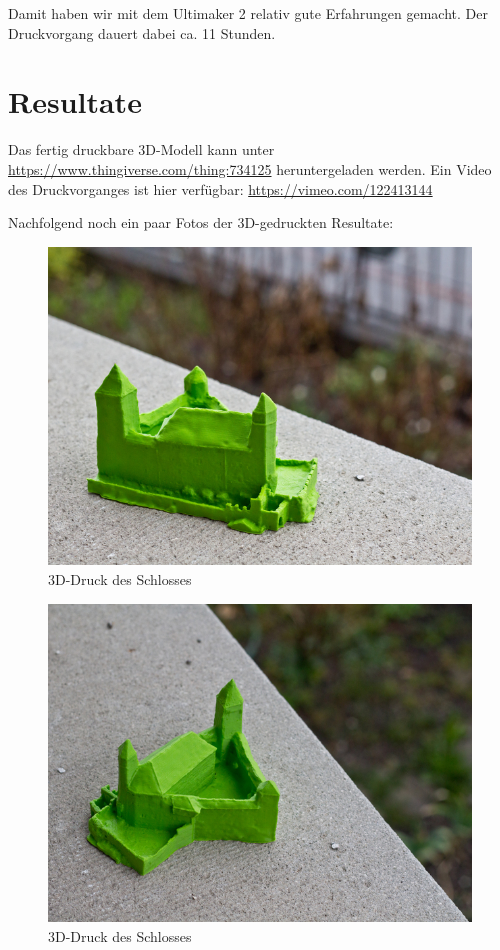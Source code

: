\noindent Damit haben wir mit dem Ultimaker 2 relativ gute Erfahrungen gemacht.
Der Druckvorgang dauert dabei ca. 11 Stunden.


\section{Resultate}

Das fertig druckbare 3D-Modell kann unter
\url{https://www.thingiverse.com/thing:734125} heruntergeladen werden. Ein Video
des Druckvorganges ist hier verfügbar: \url{https://vimeo.com/122413144}

Nachfolgend noch ein paar Fotos der 3D-gedruckten Resultate:

\begin{figure}[H]
	\centering
	\includegraphics[width=\textwidth]{images/castle-printed-1}
	\caption{3D-Druck des Schlosses}
	\label{img:castle_printed_1}
\end{figure}

\begin{figure}[H]
	\centering
	\includegraphics[width=\textwidth]{images/castle-printed-2}
	\caption{3D-Druck des Schlosses}
	\label{img:castle_printed_2}
\end{figure}

